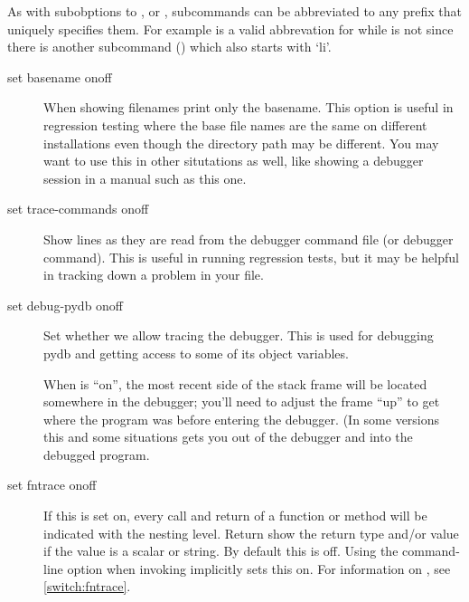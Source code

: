 As with subobptions to , or , 
subcommands can be abbreviated to any prefix that uniquely
specifies them. For example  is a valid abbrevation for
 while  is not since there is another
subcommand () which also starts with `li'.

\begin{description}

\item[set basename on\code{\Large{|}}off]\label{command:basename}

When showing filenames print only the basename. This option is useful
in regression testing where the base file names are the same
on different installations even though the directory path may
be different. You may want to use this in other
situtations as well, like showing a debugger session in a manual
such as this one. 

\item[set trace-commands on\code{\Large{|}}off]\label{command:trace-commands}
 
Show lines as they are read from the debugger command file (or
 debugger command). This is useful in running
regression tests, but it may be helpful in tracking down a problem in
your  file.

\item[set debug-pydb on\code{\Large{|}}off]\label{command:debug-pydb}

Set whether we allow tracing the debugger. This is used for debugging
pydb and getting access to some of its object variables. 

When  is ``on'', the most recent side of the stack
frame will be located somewhere in the debugger; you'll need to adjust
the frame ``up'' to get where the program was before entering the
debugger. (In some versions this and some situations 
gets you out of the debugger and into the debugged program.

\item[set fntrace on\code{\Large{|}}off]\label{command:fntrace}

If this is set on, every call and return of a function or method will
be indicated with the nesting level. Return show the return type
and/or value if the value is a scalar or string.  By default this is
off. Using the command-line option  when invoking
 implicitly sets this on.  For information on
, see \ref{switch:fntrace}.


\end{description}
